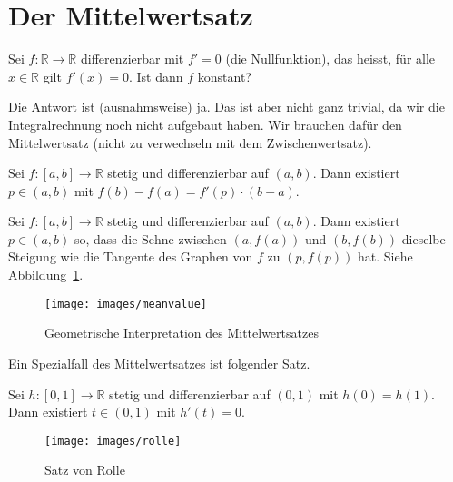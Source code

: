 \documentclass[../main.tex]{subfiles}
\begin{document}
\section{Der Mittelwertsatz}
\begin{question}
  Sei $f \colon \mathbb{R} \to \mathbb{R}$
  differenzierbar mit $f' = 0$ (die Nullfunktion),
  das heisst, für alle $x \in \mathbb{R}$ gilt
  $f'(x) = 0$. Ist dann $f$ konstant?
\end{question}

Die Antwort ist (ausnahmsweise) ja.
Das ist aber nicht ganz trivial, da wir
die Integralrechnung noch nicht aufgebaut haben.
Wir brauchen dafür den Mittelwertsatz
(nicht zu verwechseln mit dem Zwischenwertsatz).

\begin{meanvalue}
  Sei $f \colon [a, b] \to \mathbb{R}$
  stetig und differenzierbar auf $(a, b)$.
  Dann existiert $p \in (a, b)$ mit $f(b) - f(a)
  = f'(p) \cdot (b-a)$.
\end{meanvalue}

\begin{geometric}
  Sei $ f \colon [a, b] \to \mathbb{R}$ stetig
  und differenzierbar auf $(a, b)$.
  Dann existiert $p \in (a, b)$ so, dass
  die Sehne zwischen $(a, f(a))$ und
  $(b, f(b))$ dieselbe Steigung
  wie die Tangente des Graphen von $f$ zu $
  (p, f(p))$ hat. Siehe Abbildung~\ref{fig:meanvalue}.
\end{geometric}

\begin{figure}[htb]
  \centering
  \texttt{[image: images/meanvalue]}
  \caption{Geometrische Interpretation
  des Mittelwertsatzes}%
  \label{fig:meanvalue}
\end{figure}

Ein Spezialfall des Mittelwertsatzes ist folgender Satz.

\begin{rolle}
  Sei $h \colon [0, 1] \to \mathbb{R}$ stetig
  und differenzierbar auf $(0, 1)$
  mit $h(0) = h(1)$.
  Dann existiert $t \in (0, 1)$
  mit $h'(t) = 0$.
\end{rolle}

\begin{figure}[htb]
  \centering
  \texttt{[image: images/rolle]}
  \caption{Satz von Rolle}%
  \label{fig:rolle}
\end{figure}
\end{document}
